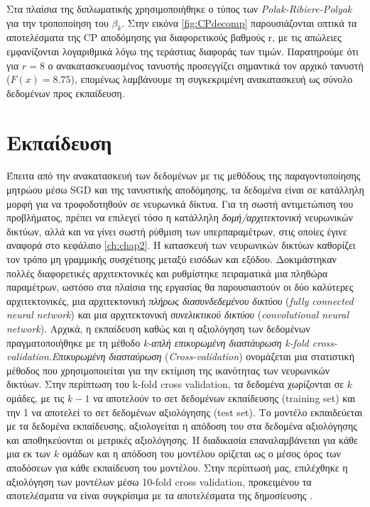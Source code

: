 \medskip
Στα πλαίσια της διπλωματικής χρησιμοποιήθηκε ο τύπος των \textit{Polak-Ribiere-Polyak} για την τροποποίηση του $\beta_k$. Στην εικόνα \ref{fig:CPdecomp} παρουσιάζονται οπτικά τα αποτελέσματα της CP αποδόμησης για διαφορετικούς βαθμούς r, με τις απώλειες εμφανίζονται λογαριθμικά λόγω της τεράστιας διαφοράς των τιμών. Παρατηρούμε ότι για $r=8$ ο ανακατασκευασμένος τανυστής προσεγγίζει σημαντικά τον αρχικό τανυστή ($F(x)=8.75$), επομένως λαμβάνουμε τη συγκεκριμένη ανακατασκευή ως σύνολο δεδομένων προς εκπαίδευση.

\bigskip
\section{Εκπαίδευση}

Έπειτα από την ανακατασκευή των δεδομένων με τις μεθόδους της παραγοντοποίησης μητρώου μέσω SGD και της τανυστικής αποδόμησης, τα δεδομένα είναι σε κατάλληλη μορφή για να τροφοδοτηθούν σε νευρωνικά δίκτυα. Για τη σωστή αντιμετώπιση του προβλήματος, πρέπει να επιλεγεί τόσο η κατάλληλη \textit{δομή/αρχιτεκτονική} νευρωνικών δικτύων, αλλά και να γίνει σωστή ρύθμιση των υπερπαραμέτρων, στις οποίες έγινε αναφορά στο κεφάλαιο \ref{ch:chap2}. Η κατασκευή των νευρωνικών δικτύων καθορίζει τον τρόπο μη γραμμικής συσχέτισης μεταξύ εισόδων και εξόδου. Δοκιμάστηκαν πολλές διαφορετικές αρχιτεκτονικές και ρυθμίστηκε πειραματικά μια πληθώρα παραμέτρων, ωστόσο στα πλαίσια της εργασίας θα παρουσιαστούν οι δύο καλύτερες αρχιτεκτονικές, μια αρχιτεκτονική \textit{πλήρως διασυνδεδεμένου δικτύου} (\textit{fully connected neural network}) και μια αρχιτεκτονική \textit{συνελικτικού δικτύου} (\textit{convolutional neural network}).
\medskip
Αρχικά, η εκπαίδευση καθώς και η αξιολόγηση των δεδομένων πραγματοποιήθηκε με τη μέθοδο \textit{k-απλή επικυρωμένη διαστάυρωση} \textit{k-fold cross-validation}.\textit{Επικυρωμένη διασταύρωση} (\textit{Cross-validation}) ονομάζεται μια στατιστική μέθοδος που χρησιμοποιείται για την εκτίμιση της ικανότητας των νευρωνικών δικτύων. Στην περίπτωση του k-fold cross validation, τα δεδομένα χωρίζονται σε $k$ ομάδες, με τις $k-1$ να αποτελούν το σετ δεδομένων εκπαίδευσης (training set) και την 1 να αποτελεί το σετ δεδομένων αξιολόγησης (test set). Το μοντέλο εκπαιδεύεται με τα δεδομένα εκπαίδευσης, αξιολογείται η απόδοση του στα δεδομένα αξιολόγησης και αποθηκεύονται οι μετρικές αξιολόγησης. Η διαδικασία επαναλαμβάνεται για κάθε μια εκ των $k$ ομάδων και η απόδοση του μοντέλου ορίζεται ως ο μέσος όρος των αποδόσεων για κάθε εκπαίδευση του μοντέλου. Στην περίπτωσή μας, επιλέχθηκε η αξιολόγηση των μοντέλων μέσω 10-fold cross validation, προκειμένου τα αποτελέσματα να είναι συγκρίσιμα με τα αποτελέσματα της δημοσίευσης \cite{Northey2017}.

